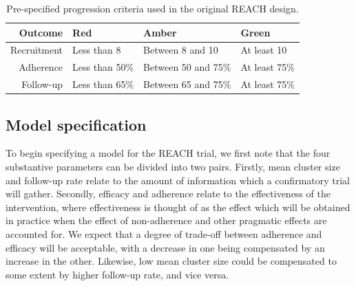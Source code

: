 \documentclass[AMA,STIX1COL]{WileyNJD-v2}
\begin{document}
\begin{table}
\caption{Pre-specified progression criteria used in the original REACH design.}
\centering
\begin{tabular}{r l l l}
\toprule
Outcome & Red & Amber & Green \\
\midrule
Recruitment & Less than 8 & Between 8 and 10 & At least 10 \\
Adherence & Less than 50\% & Between 50 and 75\% & At least 75\% \\
Follow-up & Less than 65\% & Between 65 and 75\% & At least 75\% \\
\bottomrule
\end{tabular}
\label{tab:pcs}
\end{table}



\subsection{Model specification}

To begin specifying a model for the REACH trial, we first note that the four substantive parameters can be divided into two pairs. Firstly, mean cluster size and follow-up rate relate to the amount of information which a confirmatory trial will gather. Secondly, efficacy and adherence relate to the effectiveness of the intervention, where effectiveness is thought of as the effect which will be obtained in practice when the effect of non-adherence and other pragmatic effects are accounted for. We expect that a degree of trade-off between adherence and efficacy will be acceptable, with a decrease in one being compensated by an increase in the other. Likewise, low mean cluster size could be compensated to some extent by higher follow-up rate, and vice versa. 
\end{document}
